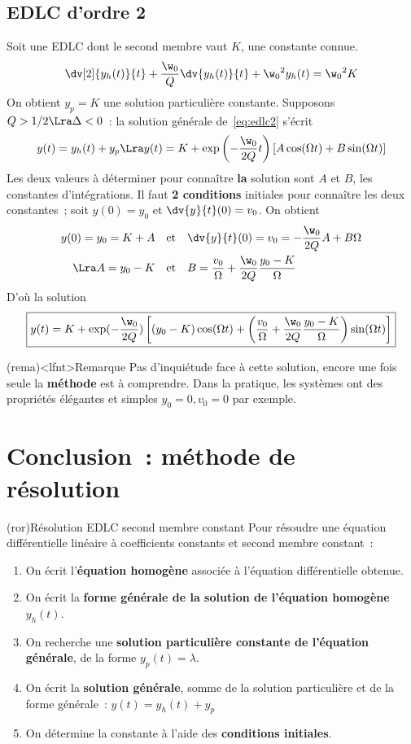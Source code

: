\documentclass[a4paper, 11pt, garamond]{book}
\begin{document}
\subsection{EDLC d'ordre 2}
Soit une EDLC dont le second membre vaut $K$, une constante connue.
\begin{equation}
	\dv[2]{y_h(t)}{t} + \frac{\w_0}{Q}\dv{y_h(t)}{t} + \w_0{}^{2} y_h(t) =
	\w_0{}^{2}K
	\label{eq:edlc2}
\end{equation}
On obtient $y_p = K$ une solution particulière constante. Supposons $Q>1/2 \Lra
	\Delta<0$~: la solution générale de~\eqref{eq:edlc2} s'écrit
\[
	y(t) = y_h(t) + y_p
	\Lra
	y(t) = K + \exp\left( -\frac{\w_0}{2Q}t \right)
	\left[A\cos(\Omega t) + B\sin(\Omega t)\right]
\]
Les deux valeurs à déterminer pour connaître \textbf{la} solution sont $A$ et
$B$, les constantes d'intégrations. Il faut \textbf{2 conditions} initiales pour
connaître les deux constantes~; soit $y(0) = y_0$ et $\dv{y}{t}\/(0) = v_0$. On
obtient
\begin{align*}
	y(0) = y_0 = K + A
	\quad & \text{et} \quad
	\dv{y}{t}\/(0) = v_0 = -\frac{\w_0}{2Q}A + B\Omega
	\\\Lra
	A = y_0 - K
	\quad & \text{et} \quad
	B = \frac{v_0}{\Omega} + \frac{\w_0}{2Q}\frac{y_0-K}{\Omega}
\end{align*}
D'où la solution
\[
	\boxed{
		y(t) = K + \exp(-\frac{\w_0}{2Q})
		\left[
			(y_0-K)\cos(\Omega t) +
			\left( \frac{v_0}{\Omega} + \frac{\w_0}{2Q}\frac{y_0-K}{\Omega} \right)
			\sin(\Omega t)
			\right]
	}
\]
\begin{tcn}(rema)<lfnt>{Remarque}
	Pas d'inquiétude face à cette solution, encore une fois seule la
	\textbf{méthode} est à comprendre. Dans la pratique, les systèmes ont des
	propriétés élégantes et simples $y_0 = 0, v_0 = 0$ par exemple.
\end{tcn}

\section{Conclusion~: méthode de résolution}
\begin{tcn}(ror){Résolution EDLC second membre constant}
	Pour résoudre une équation différentielle linéaire à
	coefficients constants et second membre constant~:
	\begin{enumerate}[label=\sqenumi]
		\item On écrit l'\textbf{équation homogène} associée à
		      l'équation différentielle obtenue.
		\item On écrit la \textbf{forme générale de la solution de
			      l'équation homogène} $y_h(t)$.
		\item On recherche une \textbf{solution particulière constante de l'équation
			      générale}, de la forme $y_p(t) = \lambda$.
		\item On écrit la \textbf{solution générale}, somme de la
		      solution particulière et de la forme générale~: $y(t) = y_h(t) + y_p$
		\item On détermine la constante à l'aide des \textbf{conditions initiales}.
	\end{enumerate}
\end{tcn}
\end{document}
